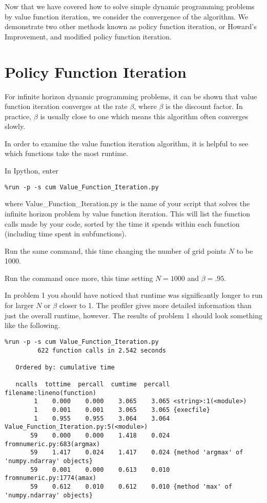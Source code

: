 

Now that we have covered how to solve simple dynamic programming problems by value function iteration, we consider the convergence of the algorithm.  We demonstrate two other methods known as policy function iteration, or Howard's Improvement, and modified policy function iteration.

\section*{Policy Function Iteration}
For infinite horizon dynamic programming problems, it can be shown that value function iteration converges at the rate $\beta$, where $\beta$ is the discount factor.  In practice, $\beta$ is usually close to one which means this algorithm often converges slowly.

In order to examine the value function iteration algorithm, it is helpful to see which functions take the most runtime.

\begin{problem}
In Ipython, enter
\begin{lstlisting}
%run -p -s cum Value_Function_Iteration.py
\end{lstlisting}
where Value\_Function\_Iteration.py is the name of your script that solves the infinite horizon problem by value function iteration.  This will list the function calls made by your code, sorted by the time it spends within each function (including time spent in subfunctions).

Run the same command, this time changing the number of grid points $N$ to be 1000.

Run the command once more, this time setting $N=1000$ and $\beta = .95$.
\end{problem}

In problem 1 you should have noticed that runtime was significantly longer to run for larger $N$ or $\beta$ closer to 1.  The profiler gives more detailed information than just the overall runtime, however.  The results of problem 1 should look something like the following.

\begin{lstlisting}
%run -p -s cum Value_Function_Iteration.py
         622 function calls in 2.542 seconds

   Ordered by: cumulative time

   ncalls  tottime  percall  cumtime  percall filename:lineno(function)
        1    0.000    0.000    3.065    3.065 <string>:1(<module>)
        1    0.001    0.001    3.065    3.065 {execfile}
        1    0.955    0.955    3.064    3.064 Value_Function_Iteration.py:5(<module>)
       59    0.000    0.000    1.418    0.024 fromnumeric.py:683(argmax)
       59    1.417    0.024    1.417    0.024 {method 'argmax' of 'numpy.ndarray' objects}
       59    0.001    0.000    0.613    0.010 fromnumeric.py:1774(amax)
       59    0.612    0.010    0.612    0.010 {method 'max' of 'numpy.ndarray' objects}
\end{lstlisting}

